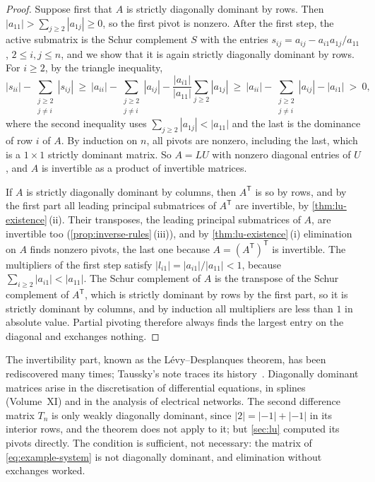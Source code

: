 \begin{proof}
Suppose first that $A$ is strictly diagonally dominant by rows. Then $|a_{11}|>\sum_{j\ge2}|a_{1j}|\ge0$, so the first pivot is nonzero. After the first step, the active submatrix is the Schur complement $S$ with the entries $s_{ij}=a_{ij}-a_{i1}a_{1j}/a_{11}$, $2\le i,j\le n$, and we show that it is again strictly diagonally dominant by rows. For $i\ge2$, by the triangle inequality,
\[
|s_{ii}|-\sum_{\substack{j\ge2\\j\ne i}}|s_{ij}|\ \ge\ |a_{ii}|-\sum_{\substack{j\ge2\\j\ne i}}|a_{ij}|-\frac{|a_{i1}|}{|a_{11}|}\sum_{j\ge2}|a_{1j}|\ \ge\ |a_{ii}|-\sum_{\substack{j\ge2\\j\ne i}}|a_{ij}|-|a_{i1}|\ >\ 0,
\]
where the second inequality uses $\sum_{j\ge2}|a_{1j}|<|a_{11}|$ and the last is the dominance of row $i$ of $A$. By induction on $n$, all pivots are nonzero, including the last, which is a $1\times1$ strictly dominant matrix. So $A=LU$ with nonzero diagonal entries of $U$, and $A$ is invertible as a product of invertible matrices.

If $A$ is strictly diagonally dominant by columns, then $A^{\mathsf T}$ is so by rows, and by the first part all leading principal submatrices of $A^{\mathsf T}$ are invertible, by \cref{thm:lu-existence}\,(ii). Their transposes, the leading principal submatrices of $A$, are invertible too (\cref{prop:inverse-rules}\,(iii)), and by \cref{thm:lu-existence}\,(i) elimination on $A$ finds nonzero pivots, the last one because $A=(A^{\mathsf T})^{\mathsf T}$ is invertible. The multipliers of the first step satisfy $|l_{i1}|=|a_{i1}|/|a_{11}|<1$, because $\sum_{i\ge2}|a_{i1}|<|a_{11}|$. The Schur complement of $A$ is the transpose of the Schur complement of $A^{\mathsf T}$, which is strictly dominant by rows by the first part, so it is strictly dominant by columns, and by induction all multipliers are less than $1$ in absolute value. Partial pivoting therefore always finds the largest entry on the diagonal and exchanges nothing.
\end{proof}

The invertibility part, known as the L\'evy--Desplanques theorem, has been rediscovered many times; Taussky's note traces its history~\cite{taussky1949}. Diagonally dominant matrices arise in the discretisation of differential equations, in splines (Volume~XI) and in the analysis of electrical networks. The second difference matrix $T_n$ is only weakly diagonally dominant, since $|2|=|-1|+|-1|$ in its interior rows, and the theorem does not apply to it; but \cref{sec:lu} computed its pivots directly. The condition is sufficient, not necessary: the matrix of \eqref{eq:example-system} is not diagonally dominant, and elimination without exchanges worked.

